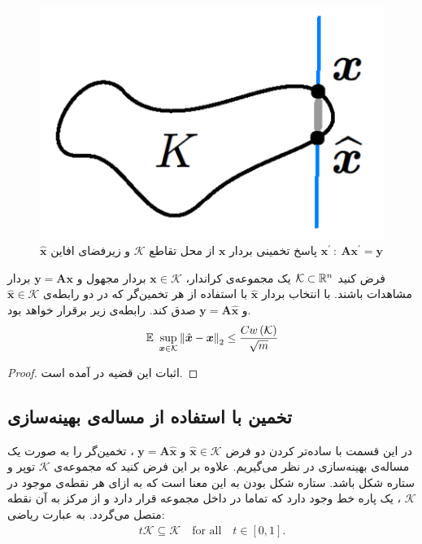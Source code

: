 \begin{figure}
\centering
\includegraphics[scale=0.35]{Images/ch2/fig9.png}
\caption{
$\hat{\bm{x}}$
پاسخ تخمینی بردار
$\bm{x}$
از محل تقاطع 
$\mathcal{K}$
و 
زیرفضای افاین
$\bm{x}^{\prime}~:~ \bm{A}\bm{x}^{\prime}=\bm{y}$
\cite{Plan2016}}
\label{fig9}
\end{figure}


\begin{theorem}
\label{theorem:thm5}
\cite[قضیه~ ۴.۱]{vershynin2015estimation}
فرض کنید
$\mathcal{K}\subset \mathbb{R}^{n}$
یک مجموعه‌ی کراندار، 
$\bm{x}\in \mathcal{K}$
بردار مجهول و
$\bm{y}= \bm{A}\bm{x}$
بردار مشاهدات باشند.
با انتخاب بردار
$\hat{\bm{x}}$
با استفاده از هر تخمین‌گر که در دو رابطه‌ی
$\hat{\bm{x}}\in \mathcal{K}$
و
$\bm{y}= \bm{A}\hat{\bm{x}}$
صدق کند. رابطه‌ی زیر برقرار خواهد بود.
\begin{align}
\label{eq:eq17}
\mathbb{E}~ \sup_{\bm{x}\in \mathcal{K}} \left\lVert\hat{\bm{x}}-\bm{x}\right\rVert_{2} \leq \dfrac{C w\left(\mathcal{K}\right)}{\sqrt{m}}
\end{align}
\end{theorem}
\begin{proof}
اثبات این قضیه در 
\cite{vershynin2015estimation}
آمده است.
\end{proof}


\subsection{تخمین با استفاده از مساله‌ی بهینه‌سازی}
در این قسمت با ساده‌تر کردن دو فرض
$\hat{\bm{x}}\in \mathcal{K}$
و
$\bm{y}= \bm{A}\hat{\bm{x}}$
، تخمین‌گر را به صورت یک مساله‌ی بهینه‌سازی در نظر می‌گیریم. علاوه بر این فرض کنید که مجموعه‌ی
$\mathcal{K}$
توپر و ستاره شکل باشد. ستاره شکل بودن به این معنا است که به ازای هر نقطه‌ی موجود در 
$\mathcal{K}$
، یک پاره خط وجود دارد که تماما در داخل مجموعه قرار دارد و از مرکز به آن نقطه متصل می‌گردد. به عبارت ریاضی:
\begin{align*}
t\mathcal{K} \subseteq \mathcal{K} \quad \text{for all} \quad t \in [0,1].
\end{align*}

